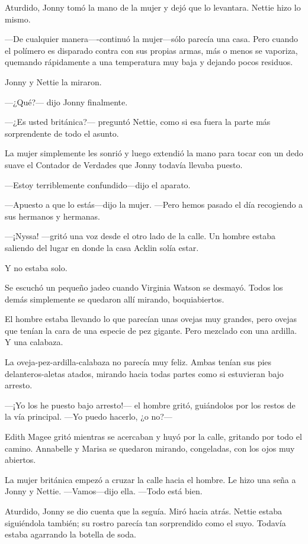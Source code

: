 Aturdido, Jonny tomó la mano de la mujer y dejó que lo levantara. Nettie
hizo lo mismo.

---De cualquier manera----continuó la mujer---sólo parecía una casa.
Pero cuando el polímero es disparado contra con sus propias armas, más o
menos se vaporiza, quemando rápidamente a una temperatura muy baja y
dejando pocos residuos.

Jonny y Nettie la miraron.

---¿Qué?--- dijo Jonny finalmente.

---¿Es usted británica?--- preguntó Nettie, como si esa fuera la parte
más sorprendente de todo el asunto.

La mujer simplemente les sonrió y luego extendió la mano para tocar con
un dedo suave el Contador de Verdades que Jonny todavía llevaba puesto.

---Estoy terriblemente confundido---dijo el aparato.

---Apuesto a que lo estás---dijo la mujer. ---Pero hemos pasado el día
recogiendo a sus hermanos y hermanas.

---¡Nyssa! ---gritó una voz desde el otro lado de la calle. Un hombre
estaba saliendo del lugar en donde la casa Acklin solía estar.

Y no estaba solo.

Se escuchó un pequeño jadeo cuando Virginia Watson se desmayó. Todos los
demás simplemente se quedaron allí mirando, boquiabiertos.

El hombre estaba llevando lo que parecían unas ovejas muy grandes, pero
ovejas que tenían la cara de una especie de pez gigante. Pero mezclado
con una ardilla. Y una calabaza.

La oveja-pez-ardilla-calabaza no parecía muy feliz. Ambas tenían sus
pies delanteros-aletas atados, mirando hacia todas partes como si
estuvieran bajo arresto.

---¡Yo los he puesto bajo arresto!--- el hombre gritó, guiándolos por
los restos de la vía principal. ---Yo puedo hacerlo, ¿o no?---

Edith Magee gritó mientras se acercaban y huyó por la calle, gritando
por todo el camino. Annabelle y Marisa se quedaron mirando, congeladas,
con los ojos muy abiertos.

La mujer británica empezó a cruzar la calle hacia el hombre. Le hizo una
seña a Jonny y Nettie. ---Vamos---dijo ella. ---Todo está bien.

Aturdido, Jonny se dio cuenta que la seguía. Miró hacia atrás. Nettie
estaba siguiéndola también; su rostro parecía tan sorprendido como el
suyo. Todavía estaba agarrando la botella de soda.

